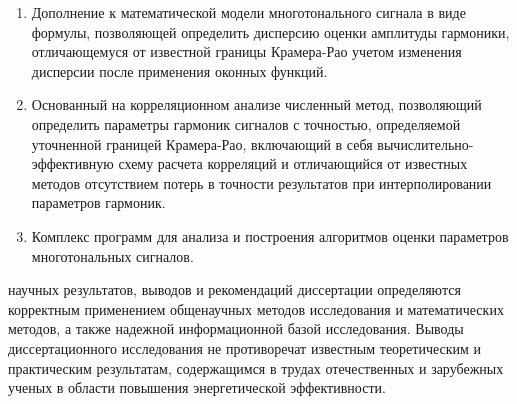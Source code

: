 

{}
\begin{enumerate}
  \item Дополнение к математической модели многотонального сигнала в виде формулы, позволяющей определить дисперсию оценки амплитуды гармоники, отличающемуся от известной границы Крамера-Рао учетом изменения дисперсии после применения оконных функций.
  \item Основанный на корреляционном анализе численный метод, позволяющий определить параметры гармоник сигналов с точностью, определяемой уточненной границей Крамера-Рао, включающий в себя вычислительно-эффективную схему расчета корреляций и отличающийся от известных методов отсутствием потерь в точности результатов при интерполировании параметров гармоник.
  \item Комплекс программ для анализа и построения алгоритмов оценки параметров многотональных сигналов.
\end{enumerate}

{\reliability} 
научных результатов, выводов и рекомендаций диссертации определяются корректным применением
общенаучных методов исследования и математических методов, а также
надежной информационной базой исследования. Выводы диссертационного исследования не противоречат известным теоретическим и практическим результатам, содержащимся в трудах отечественных и зарубежных ученых в области повышения энергетической эффективности.



